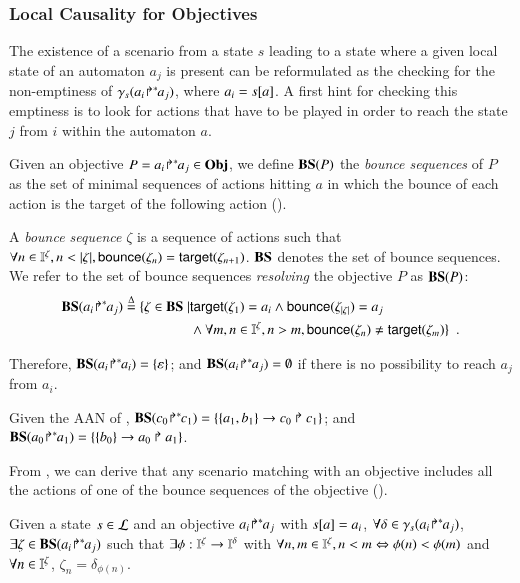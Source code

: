 \subsubsection{Local Causality for Objectives}

The existence of a scenario from a state $s$ leading to a state
where a given local state of an automaton $a_j$ is present
can be reformulated as the checking for the non-emptiness of $\gamma_s({a_i\!\Rsh^*\!\!a_j})$, where
$a_i=s[{a}]$.
A first hint for checking this emptiness is to look for actions that have to be played in order to
reach the state $j$ from $i$ within the automaton $a$.

Given an objective $P = {a_i\!\Rsh^*\!\!a_j} \in\mathbf{Obj}$, we define $\mathbf{BS}(P)$ the \emph{bounce sequences} of
$P$ as the set of minimal sequences of actions hitting $a$ in which the bounce of each action is
the target of the following action ().

\begin{definition}\label{def:bs}
A \emph{bounce sequence} $\zeta$  is a sequence of actions such that
$\forall n\in\indexes{\zeta}, n<|\zeta|,
\bounce{\zeta_{n}} = \target{\zeta_{n+1}}$.
$\mathbf{BS}$ denotes the set of bounce sequences.
We refer to the set of bounce sequences \emph{resolving} the objective $P$ as
$\mathbf{BS}(P)$:
\begin{align*}
\mathbf{BS}({a_i\!\Rsh^*\!\!a_j}) \stackrel{\Delta}= \{ \zeta\in\mathbf{BS}\mid & \mathsf{target}(\zeta_1)=a_i\wedge
			    \mathsf{bounce}(\zeta_{|\zeta|})=a_j \\
& \wedge \forall m,n\in\mathbb{I}^{\zeta}, n>m, \mathsf{bounce}(\zeta_n)\neq\mathsf{target}(\zeta_m)
				\}\enspace.
\end{align*}
\end{definition}

Therefore,
$\mathbf{BS}({a_i\!\Rsh^*\!\!a_i}) = \{\varepsilon\}$; and
$\mathbf{BS}({a_i\!\Rsh^*\!\!a_j}) = \emptyset$ if there is no possibility to reach $a_j$ from
$a_i$.

\begin{example}
Given the AAN of ,
$\mathbf{BS}({c_0\!\Rsh^*\!\!c_1}) = \{\{a_1,b_1\}\rightarrow c_0\Rsh c_1\}$;
and 
$\mathbf{BS}({a_0\!\Rsh^*\!\!a_1}) = \{\{b_0\}\rightarrow a_0\Rsh a_1\}$.
\end{example}

From , we can derive that any scenario matching with an objective includes all the
actions of one of the bounce sequences of the objective ().
\begin{lemma}
Given a state $s\in \mathcal{L}$ and an objective ${a_i\!\Rsh^*\!\!a_j}$ with $s[{a}]=a_i$,
$\forall\delta\in\gamma_s({a_i\!\Rsh^*\!\!a_j})$,
$\exists\zeta\in\mathbf{BS}({a_i\!\Rsh^*\!\!a_j})$ such that
$\exists \phi: \mathbb{I}^{\zeta}\to\mathbb{I}^{\delta}$
with
$\forall n,m\in\mathbb{I}^{\zeta}, n<m \Leftrightarrow \phi(n)<\phi(m)$
and
$\forall n\in\mathbb{I}^{\zeta}$, $\zeta_n = \delta_{\phi(n)}$.
\label{lem:bs-concr}
\end{lemma}



